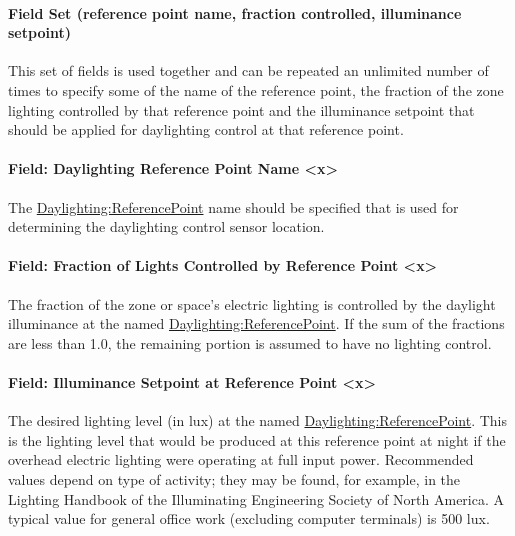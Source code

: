\paragraph{Field Set (reference point name, fraction controlled, illuminance setpoint)}\label{field-set-daylightingcontrols}

This set of fields is used together and can be repeated an unlimited number of times to specify some of the name of the reference point, the fraction of the zone lighting controlled by that reference point and the illuminance setpoint that should be applied for daylighting control at that reference point.

\paragraph{Field: Daylighting Reference Point Name <x>}\label{field-daylighting-reference-point-name-x}

The \hyperref[daylightingreferencepoint-000]{Daylighting:ReferencePoint} name should be specified that is used for determining the daylighting control sensor location.

\paragraph{Field: Fraction of Lights Controlled by Reference Point <x>}\label{field-fraction-of-lights-controlled-by-reference-point-x}

The fraction of the zone or space's electric lighting is controlled by the daylight illuminance at the named \hyperref[daylightingreferencepoint-000]{Daylighting:ReferencePoint}. If the sum of the fractions are less than 1.0, the remaining portion is assumed to have no lighting control.

\paragraph{Field: Illuminance Setpoint at Reference Point <x>}\label{field-illuminance-setpoint-at-reference-point-x}

The desired lighting level (in lux) at the named \hyperref[daylightingreferencepoint-000]{Daylighting:ReferencePoint}. This is the lighting level that would be produced at this reference point at night if the overhead electric lighting were operating at full input power. Recommended values depend on type of activity; they may be found, for example, in the Lighting Handbook of the Illuminating Engineering Society of North America. A typical value for general office work (excluding computer terminals) is 500 lux.

